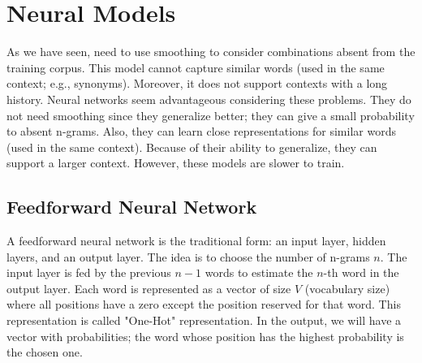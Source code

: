 \documentclass{KBook}
\begin{document}
\section{Neural Models}

As we have seen,  need to use smoothing to consider combinations absent from the training corpus. 
This model cannot capture similar words (used in the same context; e.g., synonyms). 
Moreover, it does not support contexts with a long history. 
Neural networks seem advantageous considering these problems. 
They do not need smoothing since they generalize better; they can give a small probability to absent n-grams. 
Also, they can learn close representations for similar words (used in the same context). 
Because of their ability to generalize, they can support a larger context. 
However, these models are slower to train.

\subsection{Feedforward Neural Network}

A feedforward neural network is the traditional form: an input layer, hidden layers, and an output layer. 
The idea is to choose the number of n-grams $n$. 
The input layer is fed by the previous $n-1$ words to estimate the $n$-th word in the output layer. 
Each word is represented as a vector of size $V$ (vocabulary size) where all positions have a zero except the position reserved for that word. 
This representation is called "One-Hot" representation. 
In the output, we will have a vector with probabilities; the word whose position has the highest probability is the chosen one. 
\end{document}
